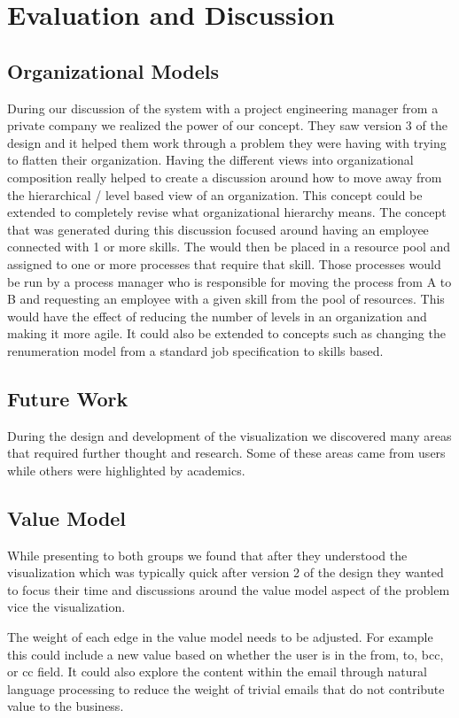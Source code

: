 \documentclass[journal]{vgtc}                %
\begin{document}
\section{Evaluation and Discussion}

\subsection{Organizational Models}
During our discussion of the system with a project engineering manager from a private company we realized the power of our concept.  They saw version 3 of the design and it helped them work through a problem they were having with trying to flatten their organization.  Having the different views into organizational composition really helped to create a discussion around how to move away from the hierarchical / level based view of an organization.  This concept could be extended to completely revise what organizational hierarchy means.  
The concept that was generated during this discussion focused around having an employee connected with 1 or more skills.  The would then be placed in a resource pool and assigned to one or more processes that require that skill.  Those processes would be run by a process manager who is responsible for moving the process from A to B and requesting an employee with a given skill from the pool of resources.  This would have the effect of reducing the number of levels in an organization and making it more agile.  It could also be extended to concepts such as changing the renumeration model from a standard job specification to skills based.

\subsection{Future Work}
During the design and development of the visualization we discovered many areas that required further thought and research.  Some of these areas came from users while others were highlighted by academics.

\subsection{Value Model}
While presenting to both groups we found that after they understood the visualization which was typically quick after version 2 of the design they wanted to focus their time and discussions around the value model aspect of the problem vice the visualization.

The weight of each edge in the value model needs to be adjusted.  For example this could include a new value based on whether the user is in the from, to, bcc, or cc field.  It could also explore the content within the email through natural language processing to reduce the weight of trivial emails that do not contribute value to the business.
\end{document}
